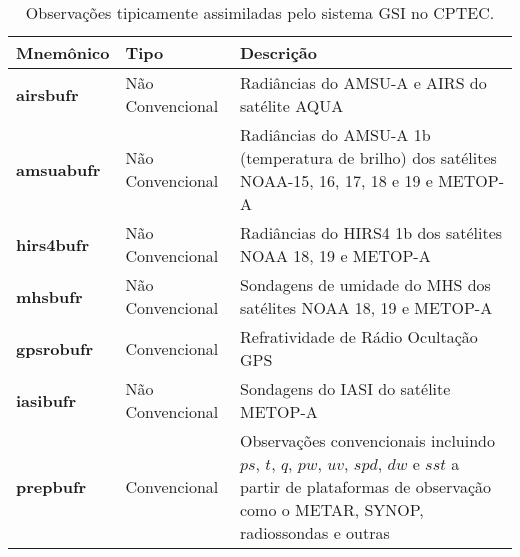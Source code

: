 \begin{table}[H]
\caption{Observações tipicamente assimiladas pelo sistema GSI no CPTEC.}
\begin{center}
\begin{adjustbox}{max width=\textwidth}
\begin{tabular}{>{\centering\bfseries}m{2.5cm} >{\centering}m{2.5cm} >{\centering\arraybackslash}m{10cm}}
\toprule
\toprule
\textbf{Mnemônico} & \textbf{Tipo} & \textbf{Descrição} \\
\midrule
\textbf{airsbufr} & Não Convencional & Radiâncias do AMSU-A e AIRS do satélite AQUA \\ 
\textbf{amsuabufr} & Não Convencional & Radiâncias do AMSU-A 1b (temperatura de brilho) dos satélites NOAA-15, 16, 17, 18 e 19 e METOP-A \\ 
\textbf{hirs4bufr} & Não Convencional & Radiâncias do HIRS4 1b dos satélites NOAA 18, 19 e METOP-A \\ 
\textbf{mhsbufr}   & Não Convencional & Sondagens de umidade do MHS dos satélites NOAA 18, 19 e METOP-A \\ 
\textbf{gpsrobufr} & Convencional     & Refratividade de Rádio Ocultação GPS \\ 
\textbf{iasibufr}  & Não Convencional & Sondagens do IASI do satélite METOP-A \\ 
\textbf{prepbufr}  & Convencional     & Observações convencionais incluindo $ps$, $t$, $q$, $pw$, $uv$, $spd$, $dw$ e $sst$ a partir de plataformas de observação como o METAR, SYNOP, radiossondas e outras \\
\bottomrule
\end{tabular}
\end{adjustbox}
\end{center}
\label{tab:mobs}
\end{table}